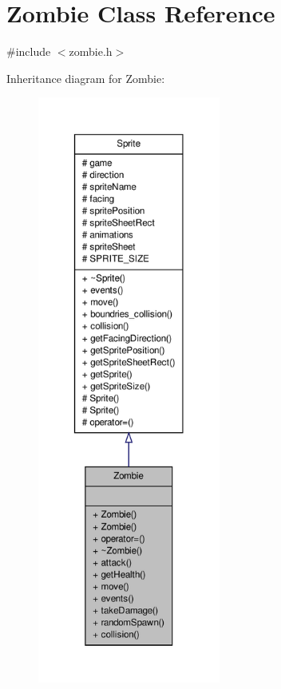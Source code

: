 \hypertarget{classZombie}{\section{Zombie Class Reference}
\label{classZombie}
}


{\ttfamily \#include $<$zombie.\-h$>$}



Inheritance diagram for Zombie\-:\nopagebreak
\begin{figure}[H]
\begin{center}
\leavevmode
\includegraphics[height=550pt]{classZombie__inherit__graph}
\end{center}
\end{figure}


